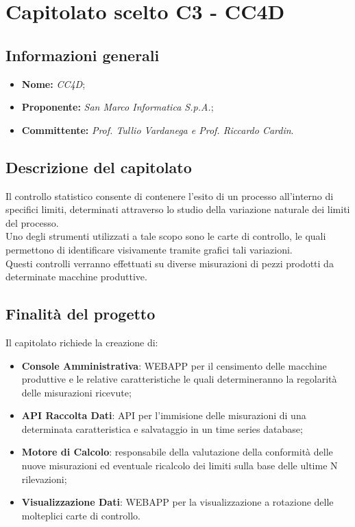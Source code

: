\section{Capitolato scelto C3 - CC4D}\label{section:c3}

\subsection{Informazioni generali}
	\begin {itemize}
		\item \textbf{Nome:} \textit{CC4D};
		\item \textbf{Proponente:} \textit{San Marco Informatica S.p.A.};
		\item \textbf{Committente:} \textit{Prof. Tullio Vardanega e Prof. Riccardo Cardin}.
	\end{itemize}

\subsection{Descrizione del capitolato}
	Il controllo statistico consente di contenere l'esito di un processo all'interno di specifici limiti, determinati attraverso lo studio della variazione naturale dei limiti del processo.\\
	Uno degli strumenti utilizzati a tale scopo sono le carte di controllo, le quali permettono di identificare visivamente tramite grafici tali variazioni.\\
	Questi controlli verranno effettuati su diverse misurazioni di pezzi prodotti da determinate macchine produttive.

\subsection{Finalità del progetto}
	Il capitolato richiede la creazione di:
	\begin{itemize}
		\item \textbf{Console Amministrativa}: WEBAPP per il censimento delle macchine produttive e le relative caratteristiche le quali determineranno la regolarità delle misurazioni ricevute;
		\item \textbf{API Raccolta Dati}: API per l'immisione delle misurazioni di una determinata caratteristica e salvataggio in un time series database\glo;
		\item \textbf{Motore di Calcolo}: responsabile della valutazione della conformità delle nuove misurazioni ed eventuale ricalcolo dei limiti sulla base delle ultime N rilevazioni;
		\item \textbf{Visualizzazione Dati}: WEBAPP per la visualizzazione a rotazione delle molteplici carte di controllo.
	\end{itemize}

